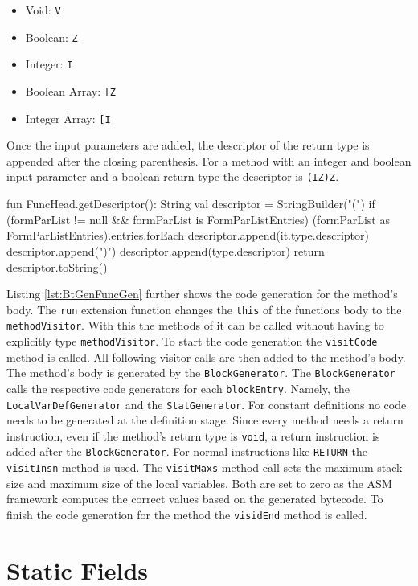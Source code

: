 \begin{itemize}
    \item Void:           \verb|V|
    \item Boolean:        \verb|Z|
    \item Integer:        \verb|I|
    \item Boolean Array: \verb|[Z|
    \item Integer Array: \verb|[I|
\end{itemize}

Once the input parameters are added, the descriptor of the return type is appended after the closing parenthesis. For a method with an integer and boolean input parameter and a boolean return type the descriptor is \verb|(IZ)Z|.


\begin{KotlinCode}[float,numbers=none,caption=Generation of the descriptor of a method., label=lst:BtGenFuncGenDesc]
fun FuncHead.getDescriptor(): String {
    val descriptor = StringBuilder("(")
    if (formParList != null && formParList is FormParListEntries) {
        (formParList as FormParListEntries).entries.forEach {
            descriptor.append(it.type.descriptor)
        }
    }
    descriptor.append(")")
    descriptor.append(type.descriptor)
    return descriptor.toString()
}
\end{KotlinCode}

Listing \ref{lst:BtGenFuncGen} further shows the code generation for the method's body. The \verb|run| extension function changes the \verb|this| of the functions body to the \verb|methodVisitor|. With this the methods of it can be called without having to explicitly type \verb|methodVisitor|. To start the code generation the \verb|visitCode| method is called. All following visitor calls are then added to the method's body. The method's body is generated by the \verb|BlockGenerator|. The \verb|BlockGenerator| calls the respective code generators for each \verb|blockEntry|. Namely, the \verb|LocalVarDefGenerator| and the \verb|StatGenerator|. For constant definitions no code needs to be generated at the definition stage. Since every method needs a return instruction, even if the method's return type is \verb|void|, a return instruction is added after the \verb|BlockGenerator|. For normal instructions like \verb|RETURN| the \verb|visitInsn| method is used. The \verb|visitMaxs| method call sets the maximum stack size and maximum size of the local variables. Both are set to zero as the ASM framework computes the correct values based on the generated bytecode. To finish the code generation for the method the \verb|visidEnd| method is called.  

\section{Static Fields}